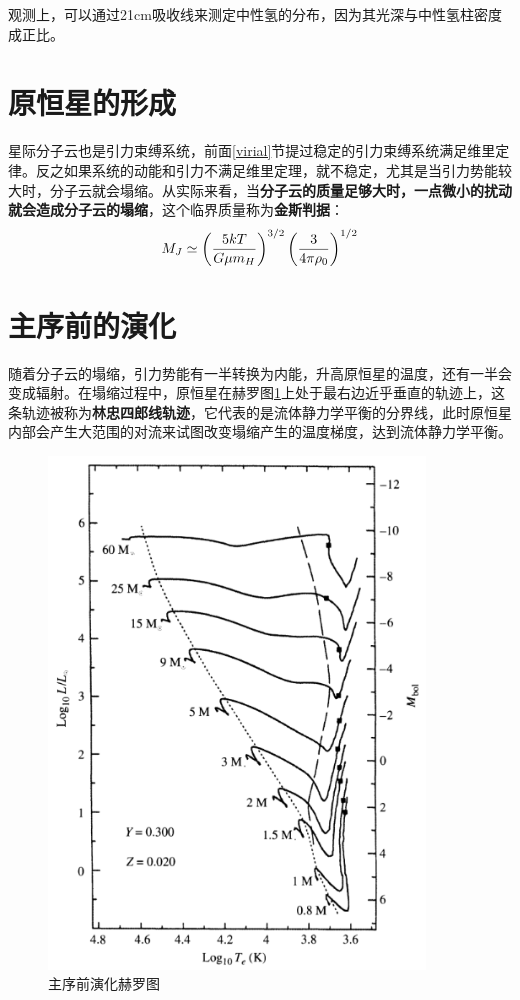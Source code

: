 \documentclass[openany]{ctexbook}
\begin{document}
观测上，可以通过21\;cm吸收线来测定中性氢的分布，因为其光深与中性氢柱密度成正比。

\section{原恒星的形成}
星际分子云也是引力束缚系统，前面\ref{virial}节提过稳定的引力束缚系统满足维里定律。反之如果系统的动能和引力不满足维里定理，就不稳定，尤其是当引力势能较大时，分子云就会塌缩。从实际来看，当\textbf{分子云的质量足够大时，一点微小的扰动就会造成分子云的塌缩}，这个临界质量称为\textbf{金斯判据}：
\begin{equation}
  M_J\simeq\left({5kT\over G\mu m_H}\right)^{3/2}\left({3\over 4\pi \rho_0}\right)^{1/2}
\end{equation}

\section{主序前的演化}
随着分子云的塌缩，引力势能有一半转换为内能，升高原恒星的温度，还有一半会变成辐射。在塌缩过程中，原恒星在赫罗图\ref{fig:hayashi}上处于最右边近乎垂直的轨迹上，这条轨迹被称为\textbf{林忠四郎线轨迹}，它代表的是流体静力学平衡的分界线，此时原恒星内部会产生大范围的对流来试图改变塌缩产生的温度梯度，达到流体静力学平衡。
\begin{figure}[hbt]
  \centering
  \includegraphics[width=10cm]{chapters/12/hayashi}
  \caption{主序前演化赫罗图}
  \label{fig:hayashi}
\end{figure}
\end{document}
